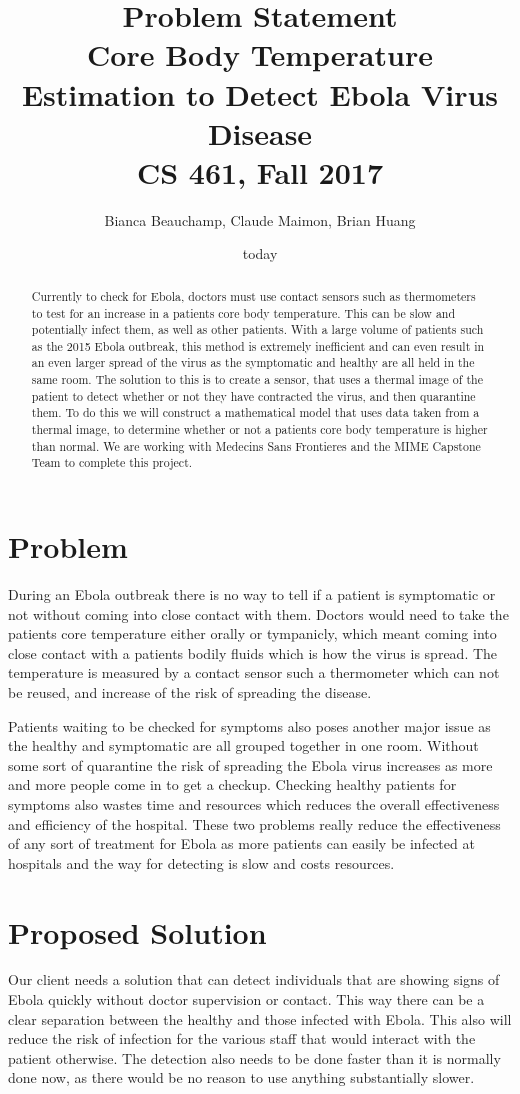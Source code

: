 \documentclass{article}
\title{%
  Problem Statement \\
  \large Core Body Temperature Estimation to Detect Ebola Virus Disease \\
  \large CS 461, Fall 2017\\
    }
\author{Bianca Beauchamp, Claude Maimon, Brian Huang}
\date{today}
\begin{document}
\maketitle
\begin{abstract}
Currently to check for Ebola, doctors must use contact sensors such as thermometers to test for an increase in a patients core body temperature. This can be slow and potentially infect them, as well as other patients. With a large volume of patients such as the 2015 Ebola outbreak, this method is extremely inefficient and can even result in an even larger spread of the virus as the symptomatic and healthy are all held in the same room. The solution to this is to create a sensor, that uses a thermal image of the patient to detect whether or not they have contracted the virus, and then quarantine them. To do this we will construct a mathematical model that uses data taken from a thermal image, to determine whether or not a patients core body temperature is higher than normal. We are working with Medecins Sans Frontieres and the MIME Capstone Team to complete this project.
\end{abstract}
\newpage

\section{Problem}
During an Ebola outbreak there is no way to tell if a patient is symptomatic or not without coming into close contact with them. Doctors would need to take the patients core temperature either orally or tympanicly, which meant coming into close contact with a patients bodily fluids which is how the virus is spread. The temperature is measured by a contact sensor such a thermometer which can not be reused, and increase of the risk of spreading the disease.

Patients waiting to be checked for symptoms also poses another major issue as the healthy and symptomatic are all grouped together in one room. Without some sort of quarantine the risk of spreading the Ebola virus increases as more and more people come in to get a checkup. Checking healthy patients for symptoms also wastes time and resources which reduces the overall effectiveness and efficiency of the hospital. These two problems really reduce the effectiveness of any sort of treatment for Ebola as more patients can easily be infected at hospitals and the way for detecting is slow and costs resources.

\section{Proposed Solution}
Our client needs a solution that can detect individuals that are showing signs of Ebola quickly without doctor supervision or contact. This way there can be a clear separation between the healthy and those infected with Ebola. This also will reduce the risk of infection for the various staff that would interact with the patient otherwise. The detection also needs to be done faster than it is normally done now, as there would be no reason to use anything substantially slower.
\end{document}

